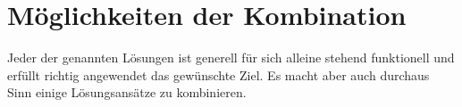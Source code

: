 \section{Möglichkeiten der Kombination}

Jeder der genannten Lösungen ist generell für sich alleine stehend funktionell und erfüllt richtig angewendet das gewünschte Ziel. Es macht aber auch durchaus Sinn einige Lösungsansätze zu kombinieren.


